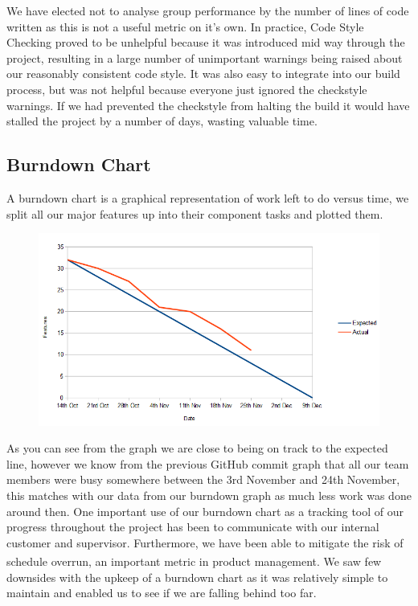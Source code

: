 \documentclass[10pt, a4paper]{article}
\begin{document}
We have elected not to analyse group performance by the number of lines of code written as this is not a useful metric on it’s own. In practice, Code Style Checking proved to be unhelpful because it was introduced mid way through the project, resulting in a large number of unimportant warnings being raised about our reasonably consistent code style. It was also easy to integrate into our build process, but was not helpful because everyone just ignored the checkstyle warnings. If we had prevented the checkstyle from halting the build it would have stalled the project by a number of days, wasting valuable time.

\subsection{Burndown Chart}

A burndown chart is a graphical representation of work left to do versus time, we split all our major features up into their component tasks and plotted them.

\begin{figure}[h]
        \centering
        \includegraphics[scale=0.5]{images/evaluation/burndown.png}
\end{figure}

As you can see from the graph we are close to being on track to the expected line, however we know from the previous GitHub commit graph that all our team members were busy somewhere between the 3rd November and 24th November, this matches with our data from our burndown graph as much less work was done around then. One important use of our burndown chart as a tracking tool of our progress throughout the project has been to communicate with our internal customer and supervisor. Furthermore, we have been able to mitigate the risk of schedule overrun, an  important metric in product management\textsuperscript{\cite{burndown}}. We saw few downsides with the upkeep of a burndown chart as it was relatively simple to maintain and enabled us to see if we are falling behind too far. 
\end{document}
